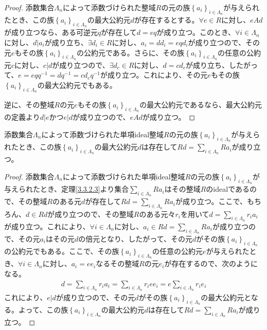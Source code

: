 \documentclass[dvipdfmx]{jsarticle}
\begin{document}
\begin{proof}
添数集合$\varLambda_{n}$によって添数づけられた整域$R$の元の族$\left\{ a_{i} \right\}_{i \in \varLambda_{n}}$が与えられたとき、この族$\left\{ a_{i} \right\}_{i \in \varLambda_{n}}$の最大公約元$d$が存在するとする。$\forall e \in R$に対し、$eAd$が成り立つなら、ある可逆元$q$が存在して$d = eq$が成り立つ。このとき、$\forall i \in \varLambda_{n}$に対し、$d|a_{i}$が成り立ち、$\exists d_{i} \in R$に対し、$a_{i} = dd_{i} = eqd_{i}$が成り立つので、その元$e$もその族$\left\{ a_{i} \right\}_{i \in \varLambda_{n}}$の公約元である。さらに、その族$\left\{ a_{i} \right\}_{i \in \varLambda_{n}}$の任意の公約元$c$に対し、$c|d$が成り立つので、$\exists d_{c} \in R$に対し、$d = cd_{c}$が成り立ち、したがって、$e = eqq^{-1} = dq^{-1} = c{d_{c}}q^{-1}$が成り立つ。これにより、その元$e$もその族$\left\{ a_{i} \right\}_{i \in \varLambda_{n}}$の最大公約元でもある。\par
逆に、その整域$R$の元$e$もその族$\left\{ a_{i} \right\}_{i \in \varLambda_{n}}$の最大公約元であるなら、最大公約元の定義より$d|e$かつ$e|d$が成り立つので、$eAd$が成り立つ。
\end{proof}
\begin{thm}\label{3.3.4.7}
添数集合$\varLambda_{n}$によって添数づけられた単項ideal整域$R$の元の族$\left\{ a_{i} \right\}_{i \in \varLambda_{n}}$が与えられたとき、この族$\left\{ a_{i} \right\}_{i \in \varLambda_{n}}$の最大公約元$d$は存在して$Rd = \sum_{i \in \varLambda_{n}} {Ra_{i}}$が成り立つ。
\end{thm}
\begin{proof}
添数集合$\varLambda_{n}$によって添数づけられた単項ideal整域$R$の元の族$\left\{ a_{i} \right\}_{i \in \varLambda_{n}}$が与えられたとき、定理\ref{3.3.2.3}より集合$\sum_{i \in \varLambda_{n}} {Ra_{i}}$はその整域$R$のidealであるので、その整域$R$のある元$d$が存在して$Rd = \sum_{i \in \varLambda_{n}} {Ra_{i}}$が成り立つ。ここで、もちろん、$d \in Rd$が成り立つので、その整域$R$のある元々$r_{i}$を用いて$d = \sum_{i \in \varLambda_{n}} {r_{i}a_{i}}$が成り立つ。これにより、$\forall i \in \varLambda_{n}$に対し、$a_{i} \in Rd = \sum_{i \in \varLambda_{n}} {Ra_{i}}$が成り立つので、その元$a_{i}$はその元$d$の倍元となり、したがって、その元$d$がその族$\left\{ a_{i} \right\}_{i \in \varLambda_{n}}$の公約元でもある。ここで、その族$\left\{ a_{i} \right\}_{i \in \varLambda_{n}}$の任意の公約元$e$が与えられたとき、$\forall i \in \varLambda_{n}$に対し、$a_{i} = ee_{i}$なるその整域$R$の元$e_{i}$が存在するので、次のようになる。
\begin{align*}
d = \sum_{i \in \varLambda_{n}} {r_{i}a_{i}} = \sum_{i \in \varLambda_{n}} {r_{i}ee_{i}} = e\sum_{i \in \varLambda_{n}} {r_{i}e_{i}}
\end{align*}
これにより、$e|d$が成り立つので、その元$d$がその族$\left\{ a_{i} \right\}_{i \in \varLambda_{n}}$の最大公約元となる。よって、この族$\left\{ a_{i} \right\}_{i \in \varLambda_{n}}$の最大公約元$d$は存在して$Rd = \sum_{i \in \varLambda_{n}} {Ra_{i}}$が成り立つ。
\end{proof}
\end{document}
